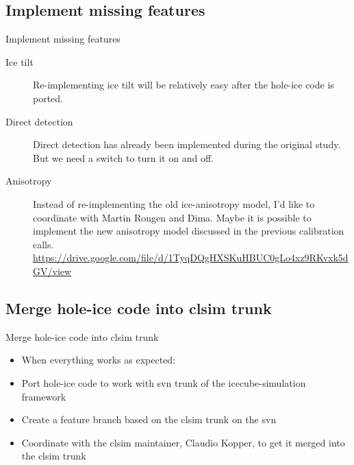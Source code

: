 \subsection{\tobedone Implement missing features}
\begin{frame}{\tobedone Implement missing features}
  \begin{description}
    \item[Ice tilt] Re-implementing ice tilt will be relatively easy after the hole-ice code is ported.
    \item[Direct detection] Direct detection has already been implemented during the original study. But we need a switch to turn it on and off.
    \item[Anisotropy] Instead of re-implementing the old ice-anisotropy model, I'd like to coordinate with Martin Rongen and Dima. Maybe it is possible to implement the new anisotropy model discussed in the previous calibration calls. \url{https://drive.google.com/file/d/1TyqDQgHXSKuHBUC0gLo4xz9RKvxk5dGV/view}
  \end{description}
\end{frame}

\subsection{\tobedone Merge hole-ice code into clsim trunk}
\begin{frame}{\tobedone Merge hole-ice code into clsim trunk}
  \begin{itemize}
    \item When everything works as expected:
    \item[\tobedone] Port hole-ice code to work with svn trunk of the icecube-simulation framework
    \item[\tobedone] Create a feature branch based on the clsim trunk on the svn
    \item[\tobedone] Coordinate with the clsim maintainer, Claudio Kopper, to get it merged into the clsim trunk
  \end{itemize}
\end{frame}
